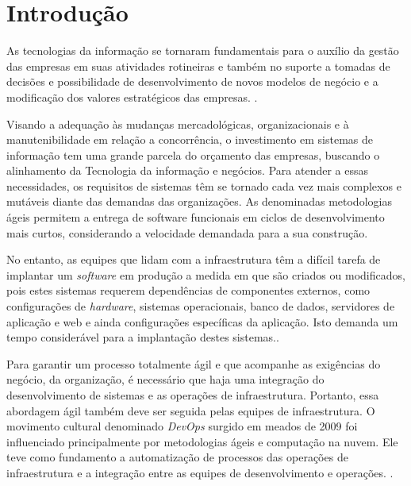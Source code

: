 \section{\esp Introdução}

As tecnologias da informação se tornaram fundamentais para o auxílio da gestão das empresas em suas atividades rotineiras e também no suporte a tomadas de decisões e possibilidade de desenvolvimento de novos modelos de negócio e a modificação dos valores estratégicos das empresas. \cite{audy}.

Visando a adequação às mudanças mercadológicas, organizacionais e à manutenibilidade em relação a concorrência, o investimento em sistemas de informação tem uma grande parcela do orçamento das empresas, buscando o alinhamento da Tecnologia da informação e negócios. \cite{luftman}  
Para atender a essas necessidades, os requisitos de sistemas têm se tornado cada vez mais complexos e mutáveis diante das demandas das organizações. As denominadas metodologias ágeis permitem a entrega de software funcionais em ciclos de desenvolvimento mais curtos, considerando a velocidade demandada para a sua construção. \cite{sbbrocco} 
          
No entanto, as equipes que lidam com a infraestrutura têm a difícil tarefa de implantar um \textit{software} em produção a medida em que são criados ou modificados, pois estes sistemas requerem dependências de componentes externos, como configurações de \textit{hardware}, sistemas operacionais, banco de dados, servidores de aplicação e web e ainda configurações específicas da aplicação. Isto demanda um tempo considerável para a implantação destes sistemas.\cite{sato}.

Para garantir um processo totalmente ágil e que acompanhe as exigências do negócio, da organização, é necessário que haja uma integração do desenvolvimento de sistemas e as operações de infraestrutura. Portanto, essa abordagem ágil também deve ser seguida pelas equipes de infraestrutura. O movimento cultural denominado \textit{DevOps} surgido em meados de 2009 foi influenciado principalmente por metodologias ágeis e computação na nuvem. Ele teve como fundamento a automatização de processos das operações de infraestrutura e a integração entre as equipes de desenvolvimento e operações.  \cite{sato}.

